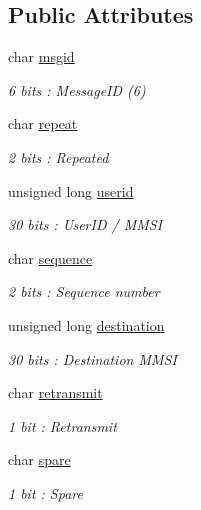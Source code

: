 \subsection*{Public Attributes}
\begin{DoxyCompactItemize}
\item 
char \mbox{\hyperlink{structaismsg__6_a674410e5087a513a8cc18c7ed5a25ceb}{msgid}}
\begin{DoxyCompactList}\small\item\em 6 bits \+: Message\+ID (6) \end{DoxyCompactList}\item 
char \mbox{\hyperlink{structaismsg__6_aac3a52c354d7575cd8e72b1c5eeef307}{repeat}}
\begin{DoxyCompactList}\small\item\em 2 bits \+: Repeated \end{DoxyCompactList}\item 
unsigned long \mbox{\hyperlink{structaismsg__6_af0d49825cc9197fe5e9d04bf61abf812}{userid}}
\begin{DoxyCompactList}\small\item\em 30 bits \+: User\+ID / M\+M\+SI \end{DoxyCompactList}\item 
char \mbox{\hyperlink{structaismsg__6_ae08724a1cd338cf62c3fbef505d920ff}{sequence}}
\begin{DoxyCompactList}\small\item\em 2 bits \+: Sequence number \end{DoxyCompactList}\item 
unsigned long \mbox{\hyperlink{structaismsg__6_ab93792be1d7e4bd787bbaff0c661689e}{destination}}
\begin{DoxyCompactList}\small\item\em 30 bits \+: Destination M\+M\+SI \end{DoxyCompactList}\item 
char \mbox{\hyperlink{structaismsg__6_a6a1494f605a9a8513af82360ecdccc47}{retransmit}}
\begin{DoxyCompactList}\small\item\em 1 bit \+: Retransmit \end{DoxyCompactList}\item 
char \mbox{\hyperlink{structaismsg__6_a02e2f42ebc0a40f12ddf478b4920ebe7}{spare}}
\begin{DoxyCompactList}\small\item\em 1 bit \+: Spare \end{DoxyCompactList}\item 

\end{DoxyCompactItemize}
